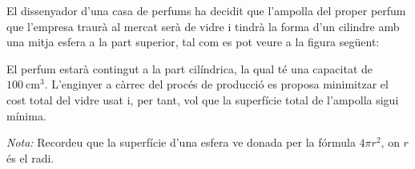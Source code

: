 El dissenyador d'una casa de perfums ha decidit que l'ampolla del proper perfum que l'empresa traurà al mercat
serà de vidre i tindrà la forma d'un cilindre amb una mitja esfera a la part superior, tal com es pot veure a
la figura següent:
\begin{center}
\end{center}
El perfum estarà contingut a la part cilíndrica, la qual té una capacitat de $100\ \text{cm}^3$. L'enginyer a
càrrec del procés de producció es proposa minimitzar el cost total del vidre usat i, per tant, vol que la
superfície total de l'ampolla sigui mínima.

\emph{Nota:} Recordeu que la superfície d'una esfera ve donada per la fórmula $4\pi r^2$, on
$r$ és el radi.

